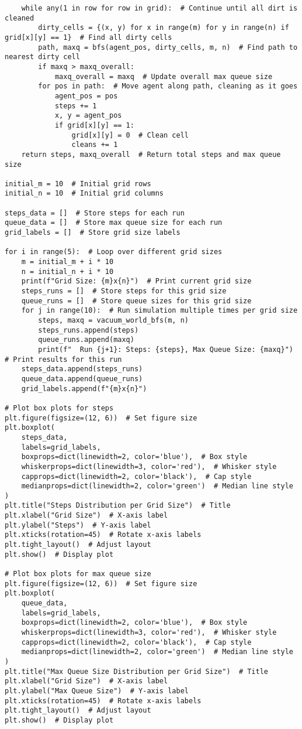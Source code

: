 \documentclass{article}
\begin{document}
\begin{lstlisting}
    while any(1 in row for row in grid):  # Continue until all dirt is cleaned
        dirty_cells = {(x, y) for x in range(m) for y in range(n) if grid[x][y] == 1}  # Find all dirty cells
        path, maxq = bfs(agent_pos, dirty_cells, m, n)  # Find path to nearest dirty cell
        if maxq > maxq_overall:
            maxq_overall = maxq  # Update overall max queue size
        for pos in path:  # Move agent along path, cleaning as it goes
            agent_pos = pos
            steps += 1
            x, y = agent_pos
            if grid[x][y] == 1:
                grid[x][y] = 0  # Clean cell
                cleans += 1
    return steps, maxq_overall  # Return total steps and max queue size

initial_m = 10  # Initial grid rows
initial_n = 10  # Initial grid columns

steps_data = []  # Store steps for each run
queue_data = []  # Store max queue size for each run
grid_labels = []  # Store grid size labels

for i in range(5):  # Loop over different grid sizes
    m = initial_m + i * 10
    n = initial_n + i * 10
    print(f"Grid Size: {m}x{n}")  # Print current grid size
    steps_runs = []  # Store steps for this grid size
    queue_runs = []  # Store queue sizes for this grid size
    for j in range(10):  # Run simulation multiple times per grid size
        steps, maxq = vacuum_world_bfs(m, n)
        steps_runs.append(steps)
        queue_runs.append(maxq)
        print(f"  Run {j+1}: Steps: {steps}, Max Queue Size: {maxq}")  # Print results for this run
    steps_data.append(steps_runs)
    queue_data.append(queue_runs)
    grid_labels.append(f"{m}x{n}")

# Plot box plots for steps
plt.figure(figsize=(12, 6))  # Set figure size
plt.boxplot(
    steps_data,
    labels=grid_labels,
    boxprops=dict(linewidth=2, color='blue'),  # Box style
    whiskerprops=dict(linewidth=3, color='red'),  # Whisker style
    capprops=dict(linewidth=2, color='black'),  # Cap style
    medianprops=dict(linewidth=2, color='green')  # Median line style
)
plt.title("Steps Distribution per Grid Size")  # Title
plt.xlabel("Grid Size")  # X-axis label
plt.ylabel("Steps")  # Y-axis label
plt.xticks(rotation=45)  # Rotate x-axis labels
plt.tight_layout()  # Adjust layout
plt.show()  # Display plot

# Plot box plots for max queue size
plt.figure(figsize=(12, 6))  # Set figure size
plt.boxplot(
    queue_data,
    labels=grid_labels,
    boxprops=dict(linewidth=2, color='blue'),  # Box style
    whiskerprops=dict(linewidth=3, color='red'),  # Whisker style
    capprops=dict(linewidth=2, color='black'),  # Cap style
    medianprops=dict(linewidth=2, color='green')  # Median line style
)
plt.title("Max Queue Size Distribution per Grid Size")  # Title
plt.xlabel("Grid Size")  # X-axis label
plt.ylabel("Max Queue Size")  # Y-axis label
plt.xticks(rotation=45)  # Rotate x-axis labels
plt.tight_layout()  # Adjust layout
plt.show()  # Display plot
\end{lstlisting}
\end{document}
